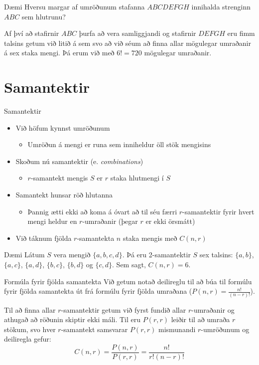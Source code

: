 \documentclass[handout]{beamer}
\begin{document}
\begin{frame}{Dæmi}
Hversu margar af umröðunum stafanna $ABCDEFGH$ innihalda strenginn $ABC$ sem hlutrunu? \pause

Af því að stafirnir $ABC$ þurfa að vera samliggjandi og stafirnir $DEFGH$ eru fimm talsins getum við litið á sem svo að við séum að finna allar mögulegar umraðanir á sex staka mengi. Þá erum við með $6! = 720$ mögulegar umraðanir.
\end{frame}

\section{Samantektir}

\begin{frame}{Samantektir}
\begin{itemize}
 \item Við höfum kynnst umröðunum
 \begin{itemize}
  \item Umröðun á mengi er runa sem inniheldur öll stök mengisins
 \end{itemize}
 \item Skoðum nú samantektir (e. \emph{combinations})
 \begin{itemize}
  \item $r$-samantekt mengis $S$ er $r$ staka hlutmengi í $S$
 \end{itemize}
 \item Samantekt hunsar röð hlutanna
 \begin{itemize}
  \item Þannig ætti ekki að koma á óvart að til séu færri $r$-samantektir fyrir hvert mengi heldur en $r$-umraðanir (þegar $r$ er ekki örsmátt)
 \end{itemize}
 \item Við táknum fjölda $r$-samantekta $n$ staka mengis með $C(n,r)$
\end{itemize}
\end{frame}

\begin{frame}{Dæmi}
Látum $S$ vera mengið $\{a, b, c, d\}$. Þá eru 2-samantektir $S$ sex talsins: $\{a, b\}$, $\{a, c\}$, $\{a, d\}$, $\{b, c\}$, $\{b, d\}$ og $\{c, d\}$. Sem sagt, $C(n, r) = 6$.
\end{frame}

\begin{frame}{Formúla fyrir fjölda samantekta}
Við getum notað deilireglu til að búa til formúlu fyrir fjölda samantekta út frá formúlu fyrir fjölda umraðana ($P(n,r) = \frac{n!}{(n-r)!}$).

Til að finna allar $r$-samantektir getum við fyrst fundið allar $r$-umraðanir og athugað að röðunin skiptir ekki máli. Til eru $P(r,r)$ leiðir til að umraða $r$ stökum, svo hver $r$-samantekt samsvarar $P(r,r)$ mismunandi $r$-umröðunum og deiliregla gefur:
\[
 C(n,r) = \frac{P(n,r)}{P(r,r)} = \frac{n!}{r!(n-r)!}
\]
\end{frame}
\end{document}
